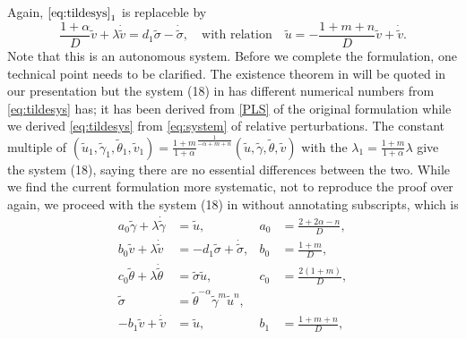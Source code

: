 \documentclass[a4paper,11pt]{article}
\def\tg{{\tilde{\gamma}}}
\def\tv{{\tilde{v}}}
\def\tth{{\tilde{\theta}}}
\def\ts{{\tilde{\sigma}}}
\def\tu{{\tilde{u}}}
\def\dtg{{\dot{\tilde{\gamma}}}}
\def\dtv{{\dot{\tilde{v}}}}
\def\dtth{{\dot{\tilde{\theta}}}}
\def\dts{{\dot{\tilde{\sigma}}}}
\theoremstyle{remark}
\begin{document}
Again, $\eqref{eq:tildesys}_1$ is replaceble by
$$\frac{1+ \alpha}{D} \tv + \lambda \dot\tv = d_1 \ts -\dot\ts, \quad \text{with relation} \quad \tu = -\frac{1+m+n}{D}\tv + \dot\tv.$$
Note that this is an autonomous system. Before we complete the formulation, one technical point needs to be clarified. The existence theorem in \cite{KLT17} will be quoted in our presentation but the system (18) in \cite{KLT17} has different numerical numbers from \eqref{eq:tildesys} has; it has been derived from \eqref{PLS} of the original formulation while we derived \eqref{eq:tildesys} from \eqref{eq:system} of relative perturbations. The constant multiple of $(\tu_1,\tg_1,\tth_1,\tv_1)=\frac{1+m}{1+\alpha}^{\frac{1}{-\alpha+m+n}}(\tu,\tg,\tth,\tv)$ with the $\lambda_1 =\frac{1+m}{1+\alpha}\lambda$ give the system (18), saying there are no essential differences between the two. While we find the current formulation more systematic, not to reproduce the proof over again, we proceed with the system (18) in \cite{KLT17} without annotating subscripts, which is
\begin{equation} \label{eq:tildesys}
 \begin{aligned}
  a_0\tg + \lambda\dtg &=\tu, & a_0&=\frac{2+2\alpha-n}{D},\\
  b_0\tv + \lambda\dtv &=-d_1 \ts + \dts,& b_0&=\frac{1+m}{D},\\
  c_0\tth+ \lambda\dtth&=\ts\tu, & c_0&=\frac{2(1+m)}{D},\\
  \ts &=\tth^{-\alpha}\tg^m\tu^n, \\
  -b_1\tv+\dtv &= \tu, & b_1&=\frac{1+m+n}{D},
 \end{aligned}
\end{equation}
\end{document}
